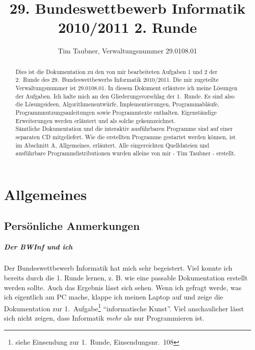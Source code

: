 \documentclass[a4paper,10pt,notitlepage]{scrreprt}
\title{29. Bundeswettbewerb Informatik 2010/2011 2. Runde}
\author{Tim Taubner, Verwaltungsnummer 29.0108.01}
\makeatletter
\renewcommand{\thechapter}{\Alph{chapter}}
\newcommand{\nobreakchap}{%
  \renewcommand\chapter{\section}
}
\newcommand{\normalchap}{%
  \renewcommand\chapter{%
  \if@openright\cleardoublepage\else\clearpage\fi
  \thispagestyle{\chapterpagestyle}%
  \global\@topnum\z@
  \@afterindentfalse
  \secdef\@chapter\@schapter}
}
\makeatother
\begin{document}
\begin{titlepage}
  \begin{samepage}
  \maketitle
  \vfill
  \begin{abstract}
   Dies ist die Dokumentation zu den von mir bearbeiteten Aufgaben 1 und 2 der 2.\ Runde des 29.\ Bundeswettbewerbs Informatik 2010/2011.
   Die mir zugeteilte Verwaltungsnummer ist 29.0108.01.
   In diesem Dokument erläutere ich meine Lösungen der Aufgaben.
   Ich halte mich an den Gliederungsvorschlag der 1.\ Runde.
   Es sind also die Lösungsideen, Algorithmenentwürfe, Implementierungen, Programmabläufe, Programmnutzungsanleitungen sowie Programmtexte enthalten.
   Eigenständige Erweiterungen werden erläutert und als solche gekennzeichnet.\\

   Sämtliche Dokumentation und die interaktiv ausführbaren Programme sind auf einer separaten CD mitgeliefert.
   Wie die erstellten Programme gestartet werden können, ist im Abschnitt A, Allgemeines, erläutert.
   Alle eingereichten Quelldateien und ausführbare Programmdistributionen wurden alleine von mir - Tim Taubner - erstellt.
  \end{abstract}
  \vfill
\setcounter{tocdepth}{0}
\setcounter{minitocdepth}{3}
  \dominitoc
\renewcommand{\contentsname}{Inhaltsübersicht}
  \nobreakchap
  \tableofcontents
  \vfill
  \normalchap
  \end{samepage}
\end{titlepage}

\renewcommand*\mtctitle{\bfseries\Large Inhalt der Aufgabendokumentation}
\nomtcrule

\chapter{Allgemeines}
\fancyhead[L]{\thechapter. Allgemeines}

\section{Persönliche Anmerkungen}
\paragraph{Der BWInf und ich}
 Der Bundeswettbewerb Informatik hat mich sehr begeistert.
 Viel konnte ich bereits durch die 1. Runde lernen, z. B. wie eine passable Dokumentation erstellt werden sollte.
 Auch das Ergebnis lässt sich sehen. Wenn ich gefragt werde, was ich eigentlich am PC mache,
 klappe ich meinen Laptop auf und zeige die Dokumentation zur 1.\ Aufgabe\footnote{siehe Einsendung zur 1.\ Runde, Einsendungsnr.\ 108}  ``informatische Kunst''.
 Viel anschaulicher lässt sich nicht zeigen, dass Informatik \emph{mehr} als nur Programmieren ist.
\end{document}
